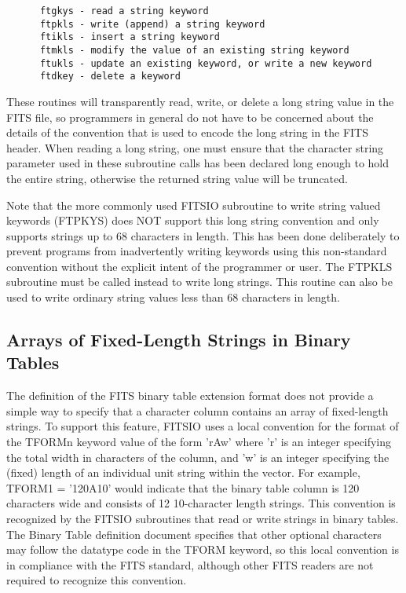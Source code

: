 \documentclass[11pt]{book}
\begin{document}
\begin{verbatim}
      ftgkys - read a string keyword
      ftpkls - write (append) a string keyword
      ftikls - insert a string keyword
      ftmkls - modify the value of an existing string keyword
      ftukls - update an existing keyword, or write a new keyword
      ftdkey - delete a keyword
\end{verbatim}
These routines will transparently read, write, or delete a long string
value in the FITS file, so programmers in general do not have to be
concerned about the details of the convention that is used to encode
the long string in the FITS header.  When reading a long string, one
must ensure that the character string parameter used in these
subroutine calls has been declared long enough to hold the entire
string, otherwise the returned string value will be truncated.

Note that the more commonly used FITSIO subroutine to write string
valued keywords (FTPKYS) does NOT support this long string convention
and only supports strings up to 68 characters in length.  This has been
done deliberately to prevent programs from inadvertently writing
keywords using this non-standard convention without the explicit intent
of the programmer or user.   The FTPKLS subroutine must be called
instead to write long strings.  This routine can also be used to write
ordinary string values less than 68 characters in length.


\subsection{Arrays of Fixed-Length Strings in Binary Tables}

The definition of the FITS binary table extension format does not
provide a simple way to specify that a character column contains an
array of fixed-length strings.  To support this feature, FITSIO uses a
local convention for the format of the TFORMn keyword value of the form
'rAw' where 'r' is an integer specifying the total width in characters
of the column, and 'w' is an integer specifying the (fixed) length of
an individual unit string within the vector.  For example, TFORM1 =
'120A10' would indicate that the binary table column is 120 characters
wide and consists of 12 10-character length strings.  This convention
is recognized by the FITSIO subroutines that read or write strings in
binary tables.   The Binary Table definition document specifies that
other optional characters may follow the datatype code in the TFORM
keyword, so this local convention is in compliance with the
FITS standard, although other FITS readers are not required to
recognize this convention.
\end{document}
